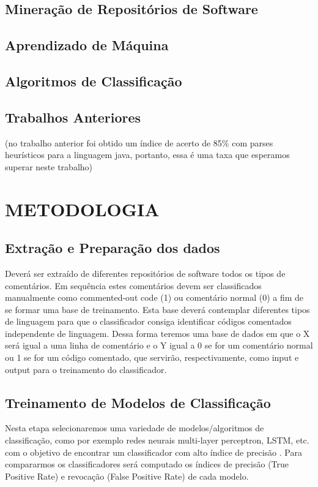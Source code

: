 \documentclass{abnt}
\begin{document}
\section{Mineração de Repositórios de Software}

\section{Aprendizado de Máquina}

\section{Algoritmos de Classificação}

\section{Trabalhos Anteriores}

(no trabalho anterior foi obtido um índice de acerto de 85\% com parses
heurísticos para a linguagem java, portanto, essa é uma taxa que esperamos
superar neste trabalho)

\chapter{METODOLOGIA}

\section{Extração e Preparação dos dados}

Deverá ser extraído de diferentes repositórios de software todos os tipos
de comentários. Em sequência estes comentários devem ser classificados 
manualmente como commented-out code (1) ou comentário normal (0) a fim de se formar 
uma base de treinamento. Esta base deverá contemplar diferentes tipos
de linguagem para que o classificador consiga identificar códigos
comentados independente de linguagem. Dessa forma teremos uma base de dados em que o X será igual a uma linha de
comentário e o Y igual a 0 se for um comentário normal ou 1 se for um 
código comentado, que servirão, respectivamente, como input e output para 
o treinamento do classificador.

\section{Treinamento de Modelos de Classificação}

Nesta etapa selecionaremos uma variedade de modelos/algoritmos de classificação,
como por exemplo redes neurais multi-layer perceptron, LSTM, etc. com o 
objetivo de encontrar um classificador com alto índice de precisão 
. Para compararmos os classificadores será 
computado os índices de precisão (True Positive Rate) e revocação
(False Positive Rate) de cada modelo.
\end{document}
